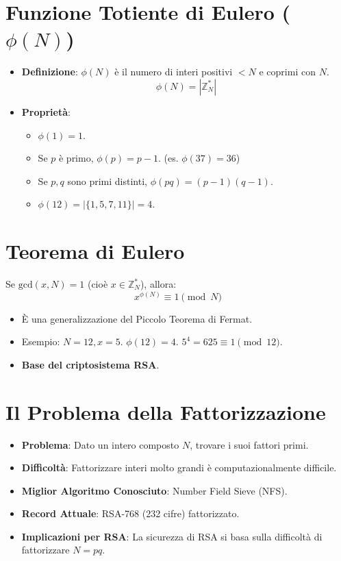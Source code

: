 \section{Funzione Totiente di Eulero ($\phi(N)$)}
\begin{itemize}
    \item \textbf{Definizione}: $\phi(N)$ è il numero di interi positivi $<N$ e coprimi con $N$.
    \[ \phi(N) = |\mathbb{Z}_N^*| \]
    \item \textbf{Proprietà}:
    \begin{itemize}
        \item $\phi(1)=1$.
        \item Se $p$ è primo, $\phi(p) = p-1$. (es. $\phi(37)=36$)
        \item Se $p, q$ sono primi distinti, $\phi(pq) = (p-1)(q-1)$.
        \item $\phi(12) = |\{1,5,7,11\}| = 4$.
    \end{itemize}
\end{itemize}

\section{Teorema di Eulero}
Se $\text{gcd}(x, N) = 1$ (cioè $x \in \mathbb{Z}_N^*$), allora:
\[ x^{\phi(N)} \equiv 1 \pmod N \]
\begin{itemize}
    \item È una generalizzazione del Piccolo Teorema di Fermat.
    \item Esempio: $N=12, x=5$. $\phi(12)=4$. $5^4 = 625 \equiv 1 \pmod{12}$.
    \item \textbf{Base del criptosistema RSA}.
\end{itemize}

\section{Il Problema della Fattorizzazione}
\begin{itemize}
    \item \textbf{Problema}: Dato un intero composto $N$, trovare i suoi fattori primi.
    \item \textbf{Difficoltà}: Fattorizzare interi molto grandi è computazionalmente difficile.
    \item \textbf{Miglior Algoritmo Conosciuto}: Number Field Sieve (NFS).
    \item \textbf{Record Attuale}: RSA-768 (232 cifre) fattorizzato.
    \item \textbf{Implicazioni per RSA}: La sicurezza di RSA si basa sulla difficoltà di fattorizzare $N=pq$.
\end{itemize}

